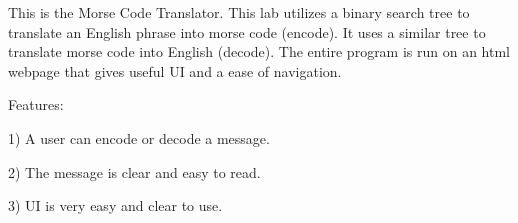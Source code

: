 This is the Morse Code Translator. This lab utilizes a binary search tree to translate an English phrase into morse code (encode). It uses a similar tree to translate morse code into English (decode). The entire program is run on an html webpage that gives useful U\+I and a ease of navigation.

Features\+:

1) A user can encode or decode a message.

2) The message is clear and easy to read.

3) U\+I is very easy and clear to use. 